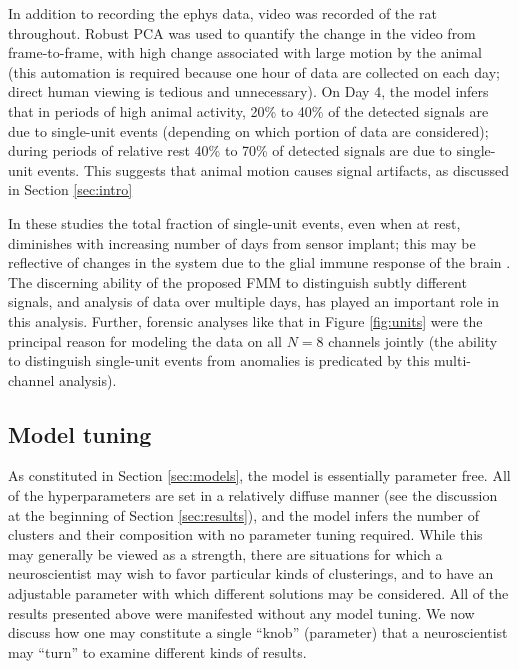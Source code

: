 \documentclass[journal]{IEEEtran}
\begin{document}
In addition to recording the ephys data, video was recorded of the rat throughout. Robust PCA \cite{Wright09} was used to quantify the change in the video from frame-to-frame, with high change associated with large motion by the animal (this automation is required because one hour of data are collected on each day; direct human viewing is tedious and unnecessary). On Day 4, the model infers that in periods of high animal activity, 20\% to 40\% of the detected signals are due to single-unit events (depending on which portion of data are considered); during periods of relative rest 40\% to 70\% of detected signals are due to single-unit events. This suggests that animal motion causes signal artifacts, as discussed in Section \ref{sec:intro}

In these studies the total fraction of single-unit events, even when at rest, diminishes with increasing number of days from sensor implant; this may be reflective of changes in the system due to the glial immune response of the brain \cite{Biran,Szarowski03}. The discerning ability of the proposed FMM to distinguish subtly different signals, and analysis of data over multiple days, has played an important role in this analysis. Further, forensic analyses like that in Figure \ref{fig:units} were the principal reason for modeling the data on all $N=8$ channels jointly (the ability to distinguish single-unit events from anomalies is predicated by this multi-channel analysis).

\subsection{Model tuning}

As constituted in Section \ref{sec:models}, the model is essentially parameter free. All of the hyperparameters are set in a relatively diffuse manner (see the discussion at the beginning of Section \ref{sec:results}), and the model infers the number of clusters and their composition with no parameter tuning required. While this may generally be viewed as a strength, there are situations for which a neuroscientist may wish to favor particular kinds of clusterings, and to have an adjustable parameter with which different solutions may be considered. All of the results presented above were manifested without any model tuning. We now discuss how one may constitute a single ``knob'' (parameter) that a neuroscientist may ``turn'' to examine different kinds of results.
\end{document}
